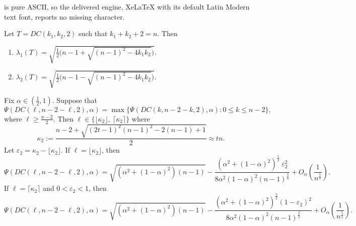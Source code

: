 \documentclass[10pt,a4paper]{amsart}
\begin{document}
is pure ASCII, so the delivered engine, XeLaTeX with its default Latin Modern text font, reports no missing character.
\begin{proposition}\label{prop:DC_path_2}
Let $T=DC(k_1, k_2,2)$ such that $k_1+k_2+2=n$. Then
\begin{enumerate}[$(i)$]
    \item $\lambda_1(T)=\sqrt{\frac{1}{2}\big(n-1+\sqrt{(n-1)^2 - 4k_1k_2} \big)}$.
    \item $\lambda_2(T)=\sqrt{\frac{1}{2}\big(n-1-\sqrt{(n-1)^2 - 4k_1k_2} \big)}$.
\end{enumerate}
\end{proposition}

\begin{proposition}\label{prop:DC_path_2_alpha}
Fix $\alpha \in (\frac{1}{2}, 1)$. Suppose that 
\[ \Psi(DC(\ell,n-2-\ell, 2), \alpha) = \max\{\Psi(DC(k,n-2-k, 2), \alpha): 0\le k\le n-2\},\]
where $\ell \ge \frac{n-2}{2}$. Then $\ell\in \{\lfloor\kappa_2\rfloor, \ \lceil \kappa_2\rceil\}$
where 
\[ \kappa_2 := \frac{n-2+\sqrt{(2t-1)^2(n-1)^2-2(n-1)+1}}{2}\approx tn.\]
Let $\varepsilon_2 = \kappa_2 - \lfloor \kappa_2\rfloor$. If $\ell = \lfloor\kappa_2\rfloor$, then 
\[ \Psi(DC(\ell, n-2-\ell, 2), \alpha) = \sqrt{(\alpha^2+(1-\alpha)^2)(n-1)}- \frac{(\alpha^2+(1-\alpha)^2)^{\frac{5}{2}}\ \varepsilon_2^2}{8\alpha^2(1-\alpha)^2(n-1)^{\frac{3}{2}}} + O_\alpha\left(\frac{1}{n^{\frac{5}{2}}}\right).\]
If $\ell = \lceil \kappa_2\rceil$ and $0<\varepsilon_2 < 1$, then 
\[ \Psi(DC(\ell, n-2-\ell, 2), \alpha) =\sqrt{(\alpha^2+(1-\alpha)^2)(n-1)}-\frac{(\alpha^2+(1-\alpha)^2)^{\frac{5}{2}}(1-\varepsilon_2)^2}{8\alpha^2(1-\alpha)^2(n-1)^{\frac{3}{2}}} + O_\alpha\left(\frac{1}{n^{\frac{5}{2}}}\right).\]
\end{proposition}
\end{document}
